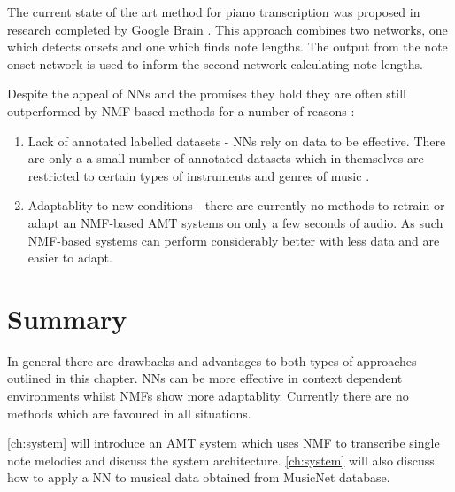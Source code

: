 The current state of the art method for piano transcription was proposed in
research completed by Google Brain \cite{google2018:Elsen}. This approach
combines two networks, one which detects onsets and one which finds note
lengths. The output from the note onset network is used to inform the second
network calculating note lengths.

Despite the appeal of NNs and the promises they hold they are often still
outperformed by \ac{NMF}-based methods for a number of reasons :
\begin{enumerate}
  \item Lack of annotated labelled datasets - \ac{NN}s rely on data to be
        effective. There are only a a small number of annotated datasets which
        in themselves are restricted to certain types of instruments and genres
        of music \cite{ground-truths:Su}.
  \item Adaptablity to new conditions - there are currently no methods to
        retrain or adapt an \ac{NMF}-based \ac{AMT} systems on only a few seconds of audio.
        As such \ac{NMF}-based systems can perform considerably better with less data
        and are easier to adapt.
\end{enumerate}

\section{Summary}

In general there are drawbacks and advantages to both types of approaches
outlined in this chapter. \ac{NN}s can be more effective in context dependent
environments whilst \ac{NMF}s show more adaptablity. Currently there are no methods
which are favoured in all situations.

\autoref{ch:system} will introduce an \ac{AMT} system which uses \ac{NMF} to transcribe
single note melodies and discuss the system architecture. \autoref{ch:system}
will also discuss how to apply a \ac{NN} to musical data obtained from
\citeyear{thickstun2018invariances} MusicNet database.